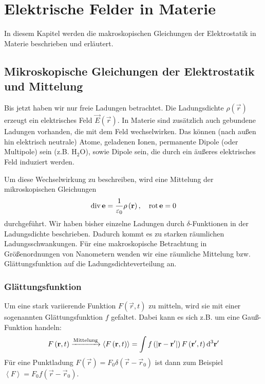 

\chapter{Elektrische Felder in Materie}

In diesem Kapitel werden die makroskopischen Gleichungen der Elektrostatik in Materie beschrieben und erläutert.



\section{Mikroskopische Gleichungen der Elektrostatik und Mittelung\label{sec:mikroskopische_gleichungen_der_elektrostatik}}

Bis jetzt haben wir nur freie Ladungen betrachtet. Die Ladungsdichte $\rho \left(\vec {r}\right)$ erzeugt ein elektrisches Feld $\vec {E}(\vec r)$. In Materie sind zusätzlich auch gebundene Ladungen vorhanden, die mit dem Feld wechselwirken. Das können (nach außen hin elektrisch neutrale) Atome, geladenen Ionen, permanente Dipole (oder Multipole) sein (z.B. $\mathrm{H}_{2}\mathrm{O}$), sowie Dipole sein, die durch ein äußeres elektrisches Feld induziert werden.

Um diese Wechselwirkung zu beschreiben, wird eine Mittelung der mikroskopischen Gleichungen
\begin{equation*}
	\divg \vec {e}=\frac{1}{\varepsilon _{0}}\rho \left(\vec {r}\right),\quad \rot \vec {e}=0
\end{equation*}
durchgeführt. Wir haben bisher einzelne Ladungen durch $\delta $-Funktionen in der Ladungsdichte beschrieben. Dadurch kommt es zu starken räumlichen Ladungsschwankungen. Für eine makroskopische Betrachtung in Größenordnungen von Nanometern wenden wir eine räumliche Mittelung bzw. Glättungsfunktion auf die Ladungsdichteverteilung an.




\subsection{Glättungsfunktion}

Um eine stark variierende Funktion $F\left(\vec {r},t\right)$ zu mitteln, wird sie mit einer sogenannten Glättungsfunktion $f$ gefaltet. Dabei kann es sich z.B. um eine Gauß-Funktion handeln:
\begin{equation*}
	F\left(\vec {r},t\right) \xrightarrow{\text{Mittelung}} \left\langle F\left(\vec {r},t\right)\right\rangle =\int f\left(\left| \vec {r}-\vec {r}'\right| \right)F\left(\vec {r}',t\right)\diffa[3]{\vec{r}'}
\end{equation*}
Für eine Punktladung $F\left(\vec {r}\right)=F_{0}\delta \left(\vec {r}-\vec {r}_{0}\right)$ ist dann zum Beispiel $\left\langle F\right\rangle =F_{0}f\left(\vec {r}-\vec {r}_{0}\right)$.

